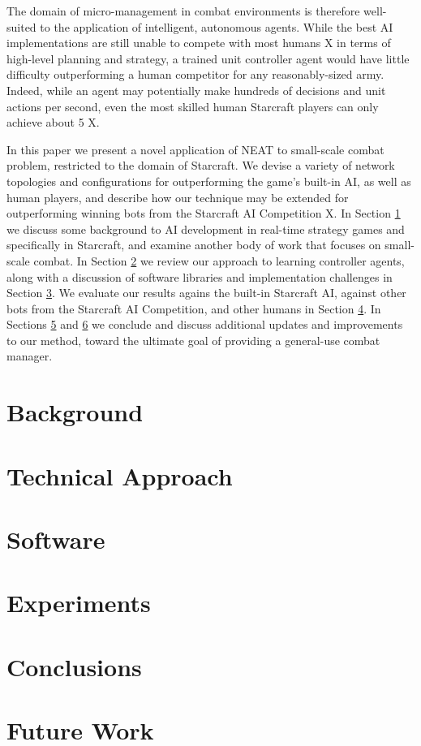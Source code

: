 \documentclass[a4paper]{article}
\newcommand{\fillin}[1]{X}
\begin{document}
The domain of micro-management in combat environments is therefore well-suited to the application of intelligent, autonomous agents. While the best AI implementations are still unable to compete with most humans \fillin{add citation to support this} in terms of high-level planning and strategy, a trained unit controller agent would have little difficulty outperforming a human competitor for any reasonably-sized army. Indeed, while an agent may potentially make hundreds of decisions and unit actions per second, even the most skilled human Starcraft players can only achieve about 5 \fillin{add citation for this}.

In this paper we present a novel application of NEAT to small-scale combat problem, restricted to the domain of Starcraft. We devise a variety of network topologies and configurations for outperforming the game's built-in AI, as well as human players, and describe how our technique may be extended for outperforming winning bots from the Starcraft AI Competition \fillin{ai competition citation}. In Section \ref{sec:back} we discuss some background to AI development in real-time strategy games and specifically in Starcraft, and examine another body of work that focuses on small-scale combat. In Section \ref{sec:tech} we review our approach to learning controller agents, along with a discussion of software libraries and implementation challenges in Section \ref{sec:soft}. We evaluate our results agains the built-in Starcraft AI, against other bots from the Starcraft AI Competition, and other humans in Section \ref{sec:exp}. In Sections \ref{sec:conclusion} and \ref{sec:future} we conclude and discuss additional updates and improvements to our method, toward the ultimate goal of providing a general-use combat manager.

\section{Background}
\label{sec:back}

\section{Technical Approach}
\label{sec:tech}

\section{Software}
\label{sec:soft}

\section{Experiments}
\label{sec:exp}

\section{Conclusions}
\label{sec:conclusion}

\section{Future Work}
\label{sec:future}


\end{document}
